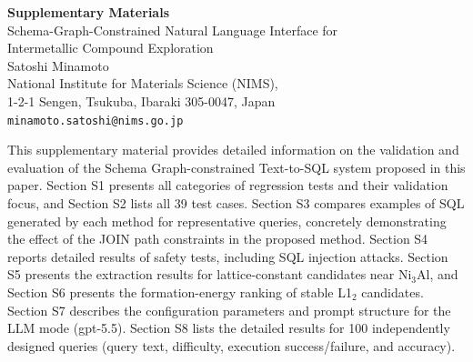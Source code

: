\documentclass[5p,twocolumn]{elsarticle}
\begin{document}



\clearpage
\onecolumn
\appendix
\renewcommand{\thesection}{S\arabic{section}}
\renewcommand{\thetable}{S\arabic{table}}
\renewcommand{\thefigure}{S\arabic{figure}}
\renewcommand{\theequation}{S\arabic{equation}}
\setcounter{section}{0}
\setcounter{table}{0}
\setcounter{figure}{0}
\setcounter{equation}{0}

\begin{center}
  {\LARGE\bfseries Supplementary Materials}\\[0.8em]
  {\large Schema-Graph-Constrained Natural Language Interface for\\
  Intermetallic Compound Exploration}\\[0.5em]
  {\normalsize Satoshi Minamoto}\\[0.3em]
  {\small National Institute for Materials Science (NIMS),\\
  1-2-1 Sengen, Tsukuba, Ibaraki 305-0047, Japan}\\[0.3em]
  {\small \texttt{minamoto.satoshi@nims.go.jp}}
\end{center}
\vspace{1.0em}
\noindent\hrulefill
\vspace{1.0em}

\noindent
This supplementary material provides detailed information on the
validation and evaluation of the Schema Graph-constrained Text-to-SQL system proposed in this paper.
Section S1 presents all categories of regression tests and their validation focus,
and Section S2 lists all 39 test cases.
Section S3 compares examples of SQL generated by each method for representative queries,
concretely demonstrating the effect of the JOIN path constraints in the proposed method.
Section S4 reports detailed results of safety tests, including SQL injection attacks.
Section S5 presents the extraction results for lattice-constant candidates near Ni$_3$Al,
and Section S6 presents the formation-energy ranking of stable L1$_2$ candidates.
Section S7 describes the configuration parameters and prompt structure for the LLM mode (gpt-5.5).
Section S8 lists the detailed results for 100 independently designed queries
(query text, difficulty, execution success/failure, and accuracy).
\end{document}
